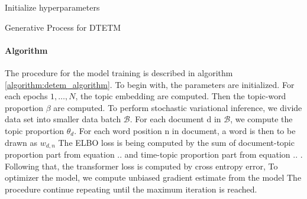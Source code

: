 \begin{algorithm}[H]
Initialize hyperparameters\\
\caption{Generative Process for DTETM}
\label{algorithm:detem_algorithm}
\end{algorithm}
\paragraph{Algorithm}The procedure for the model training is described in algorithm \ref{algorithm:detem_algorithm}. To begin with, the parameters are initialized.
For each epochs $ 1,\dots, N $, the topic embedding are computed. 
Then the topic-word proportion $ \beta $ are computed.
To perform stochastic variational inference, we divide data set into smaller data batch $ \mathcal{B} $.
For each document d in $ \mathcal{B} $, we compute the topic proportion $ \theta_d $. For each word position n in document, a word is then to be drawn as $ w_{d,n} $
The ELBO loss is being computed by the sum of document-topic proportion part from equation .. and time-topic proportion part from equation .. .
Following that, the transformer loss is computed by cross entropy error, 
To optimizer the model, we compute unbiased gradient estimate from the model 
The procedure continue repeating until the maximum iteration is reached.

